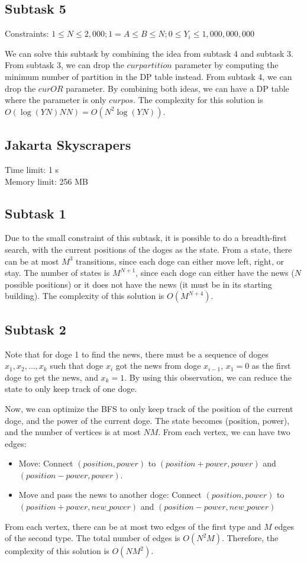\documentclass[a4paper]{article}
\begin{document}
\subsection*{Subtask 5}
Constraints: $1\leq N \leq 2,000; 1 = A \leq B \leq N; 0 \leq Y_i \leq 1,000,000,000$

We can solve this subtask by combining the idea from subtask 4 and subtask 3. From subtask 3, we can drop the $curpartition$ parameter by computing the minimum number of partition in the DP table instead. From subtask 4, we can drop the $curOR$ parameter. By combining both ideas, we can have a DP table where the parameter is only $curpos$. The complexity for this solution is $O(\log(YN)NN) = O(N^2\log(YN))$.

\newpage
\begin{center}
    \section*{Jakarta Skyscrapers}
    Time limit: 1 s\\
    Memory limit: 256 MB
\end{center}

\subsection*{Subtask 1}
Due to the small constraint of this subtask, it is possible to do a breadth-first search, with the current positions of the doges as the state. From a state, there can be at most $M^3$ transitions, since each doge can either move left, right, or stay. The number of states is $M^{N+1}$, since each doge can either have the news ($N$ possible positions) or it does not have the news (it must be in its starting building). The complexity of this solution is $O(M^{N+4})$.
\subsection*{Subtask 2}
Note that for doge 1 to find the news, there must be a sequence of doges ${x_1, x_2, \ldots, x_k}$ such that doge $x_i$ got the news from doge $x_{i-1}$, $x_1 = 0$ as the first doge to get the news, and $x_k = 1$. By using this observation, we can reduce the state to only keep track of one doge.

Now, we can optimize the BFS to only keep track of the position of the current doge, and the power of the current doge. The state becomes (position, power), and the number of vertices is at most $NM$. From each vertex, we can have two edges:
\begin{itemize}
    \item Move: Connect $(position, power)$ to $(position + power, power)$ and $(position - power, power)$.
    \item Move and pass the news to another doge: Connect $(position, power)$ to $(position + power, new\_ power)$ and $(position - power, new\_ power)$
\end{itemize}
From each vertex, there can be at most two edges of the first type and $M$ edges of the second type. The total number of edges is $O(N^2M)$. Therefore, the complexity of this solution is $O(NM^2)$.
\end{document}
